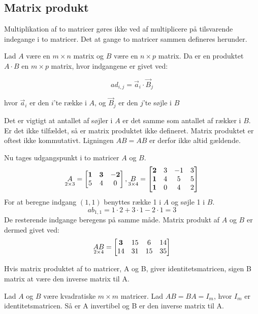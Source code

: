 \subsection{Matrix produkt}
Multiplikation af to matricer gøres ikke ved af multiplicere på tilsvarende indegange i to matricer. Det at gange to matricer sammen defineres herunder. 
\begin{defn} 
Lad $A$ være en $m \times n$ matrix og $B$ være en $n \times p$ matrix. Da er en produktet $A \cdot B$ en $m \times p$ matrix, hvor indgangene er givet ved: 

$$ad_{i,j} = \vec{a}_i \cdot \vec{B}_j$$

hvor $\vec{a}_i$ er den $i$'te række i $A$, og $\vec{B}_j$ er den $j$'te søjle i $B$
\label{def:(matrixprodukt)}
\end{defn}
Det er vigtigt at antallet af søjler i $A$ er det samme som antallet af rækker i $B$. Er det ikke tilfældet, så er matrix produktet ikke defineret. Matrix produktet er oftest ikke kommutativt. Ligningen $AB=AB$ er derfor ikke altid gældende. 
\begin{eks}
Nu tages udgangspunkt i to matricer $A$ og $B$. 
\begin{align*}
\underset{2 \times 3}{A}= \begin{bmatrix}
	\bf{1} & \bf{3} & \bf{-2} \\
	5 & 4 & 0 	
\end{bmatrix},
\underset{3 \times 4}{B}= \begin{bmatrix}
	\bf{2} & 3 & -1 & 3 \\
	\bf{1} & 4 & 5 & 5\\
	\bf{1} & 0 & 4 & 2
\end{bmatrix}  
\end{align*}
For at beregne indgang $(1,1)$ benyttes række 1 i $A$ og søjle 1 i $B$. 
$$ab_{1,1}=1\cdot 2+3\cdot 1-2 \cdot 1 = 3$$ 
De resterende indgange beregens på samme måde. 
Matrix produkt af $A$ og $B$ er dermed givet ved:
\begin{align*}
\underset{2 \times 4}{AB}= \begin{bmatrix}
	\bf{3} & 15 & 6 & 14 \\
	14 & 31 & 15 & 35
\end{bmatrix}  
\end{align*}
\end{eks}

Hvis matrix produktet af to matricer, A og B, giver identitetsmatricen, sigen B matrix at være den inverse matrix til A. 
\begin{defn}
Lad $A$ og $B$ være kvadratiske $m \times m$ matricer. Lad $AB=BA=I_m$, hvor $I_m$ er identitetsmatricen. Så er A invertibel og B er den inverse matrix til A. 
\label{def(inversmatrix)}
\end{defn}

